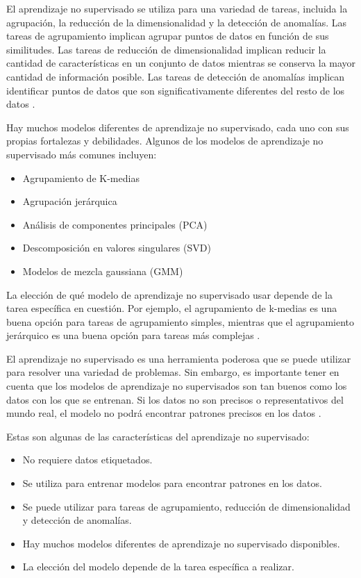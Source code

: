 El aprendizaje no supervisado se utiliza para una variedad de tareas, incluida la agrupación, la reducción de la dimensionalidad y la detección de anomalías. Las tareas de agrupamiento implican agrupar puntos de datos en función de sus similitudes. Las tareas de reducción de dimensionalidad implican reducir la cantidad de características en un conjunto de datos mientras se conserva la mayor cantidad de información posible. Las tareas de detección de anomalías implican identificar puntos de datos que son significativamente diferentes del resto de los datos \cite{G-Cloud_2023}.

Hay muchos modelos diferentes de aprendizaje no supervisado, cada uno con sus propias fortalezas y debilidades. Algunos de los modelos de aprendizaje no supervisado más comunes incluyen:

\begin{itemize}
    \item Agrupamiento de K-medias
    \item Agrupación jerárquica
    \item Análisis de componentes principales (PCA)
    \item Descomposición en valores singulares (SVD)
    \item Modelos de mezcla gaussiana (GMM)
\end{itemize}

La elección de qué modelo de aprendizaje no supervisado usar depende de la tarea específica en cuestión. Por ejemplo, el agrupamiento de k-medias es una buena opción para tareas de agrupamiento simples, mientras que el agrupamiento jerárquico es una buena opción para tareas más complejas \cite{G-Cloud_2023}.

El aprendizaje no supervisado es una herramienta poderosa que se puede utilizar para resolver una variedad de problemas. Sin embargo, es importante tener en cuenta que los modelos de aprendizaje no supervisados son tan buenos como los datos con los que se entrenan. Si los datos no son precisos o representativos del mundo real, el modelo no podrá encontrar patrones precisos en los datos \cite{tello2007reconocimiento}.

Estas son algunas de las características del aprendizaje no supervisado:
\begin{itemize}
    \item No requiere datos etiquetados.
    \item Se utiliza para entrenar modelos para encontrar patrones en los datos.
    \item Se puede utilizar para tareas de agrupamiento, reducción de dimensionalidad y detección de anomalías.
    \item Hay muchos modelos diferentes de aprendizaje no supervisado disponibles.
    \item La elección del modelo depende de la tarea específica a realizar.
\end{itemize}

